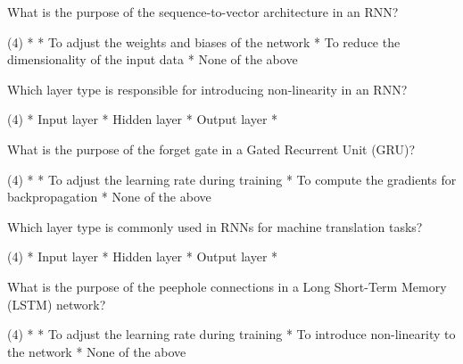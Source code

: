 \documentclass[10pt]{extarticle}
\begin{document}
\begin{exercise}
    What is the purpose of the sequence-to-vector architecture in an RNN?
    \begin{choice} (4)
        * 
        * To adjust the weights and biases of the network
        * To reduce the dimensionality of the input data
        * None of the above
    \end{choice}
\end{exercise}
\begin{solution}
\end{solution}

\begin{exercise}
    Which layer type is responsible for introducing non-linearity in an RNN?
    \begin{choice} (4)
        * Input layer
        * Hidden layer
        * Output layer
        * 
    \end{choice}
\end{exercise}
\begin{solution}
\end{solution}

\begin{exercise}
    What is the purpose of the forget gate in a Gated Recurrent Unit (GRU)?
    \begin{choice} (4)
        * 
        * To adjust the learning rate during training
        * To compute the gradients for backpropagation
        * None of the above
    \end{choice}
\end{exercise}
\begin{solution}
\end{solution}

\begin{exercise}
    Which layer type is commonly used in RNNs for machine translation tasks?
    \begin{choice} (4)
        * Input layer
        * Hidden layer
        * Output layer
        * 
    \end{choice}
\end{exercise}
\begin{solution}
\end{solution}

\begin{exercise}
    What is the purpose of the peephole connections in a Long Short-Term Memory (LSTM) network?
    \begin{choice} (4)
        * 
        * To adjust the learning rate during training
        * To introduce non-linearity to the network
        * None of the above
    \end{choice}
\end{exercise}
\begin{solution}
\end{solution}
\end{document}
